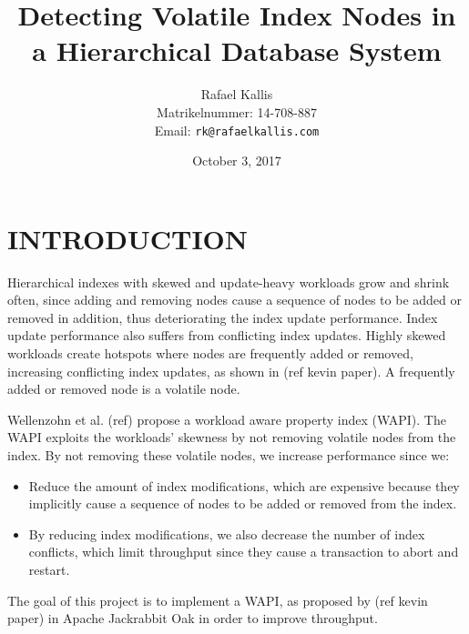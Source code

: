 \documentclass[abstracton,12pt]{scrreprt}
\title{Detecting Volatile Index Nodes in a Hierarchical Database System}
\author{
  Rafael Kallis\\[-5pt]
  \scriptsize Matrikelnummer: 14-708-887\\[-5pt]
  \scriptsize Email: \texttt{rk@rafaelkallis.com}
}
\date{\vspace*{2cm}October 3, 2017}
\begin{document}
\maketitle





\chapter{INTRODUCTION}

Hierarchical indexes with skewed and update-heavy workloads grow and shrink often,
since adding and removing nodes cause a sequence of nodes to be added or removed in addition, thus deteriorating the index update performance.
Index update performance also suffers from conflicting index updates.
Highly skewed workloads create hotspots where nodes are frequently added or removed, increasing conflicting index updates, as shown in (ref kevin paper).
A frequently added or removed node is a volatile node.

Wellenzohn et al. (ref) propose a workload aware property index (WAPI). 
The WAPI exploits the workloads' skewness by not removing volatile nodes from the index.
By not removing these volatile nodes, we increase performance since we:
\begin{itemize}
    \item Reduce the amount of index modifications, which are expensive because they implicitly cause a sequence of nodes to be added or removed from the index.
    \item By reducing index modifications, we also decrease the number of index conflicts, which limit throughput since they cause a transaction to abort and restart.
\end{itemize}

The goal of this project is to implement a WAPI, as proposed by (ref kevin paper) in Apache Jackrabbit Oak in order to improve throughput.
\end{document}
